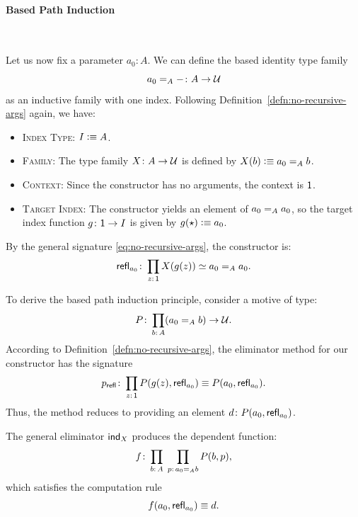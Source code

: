 \paragraph{Based Path Induction}\ 

Let us now fix a parameter $a_0\colon A$. We can define the based identity type family
\[
    a_0\eq A\dummy\colon A\to\univ
\]
as an inductive family with one index. Following Definition~\ref{defn:no-recursive-args} again, we have:
\begin{itemize}
    \item \textsc{Index Type:} $I\mathrel{\vcentcolon}\equiv A$.
    
    \item \textsc{Family:} The type family $X\colon A\to\univ$ is defined by $X(b)\mathrel{\vcentcolon}\equiv a_0\mathrel{=_{A}}b$.
    
    \item \textsc{Context:} Since the constructor has no arguments, the context is $\mathsf{1}$.
    
    \item \textsc{Target Index:} The constructor yields an element of $a_0\mathrel{=_{A}}a_0$, so the target index function $g\colon\fun1\to I$ is given by $g({\mathsf{\star}})\mathrel{\vcentcolon}\equiv a_0$.
\end{itemize}

By the general signature \eqref{eq:no-recursive-args}, the constructor is:
\[
    \fun{refl}_{a_0}\colon\prod_{z\colon\fun1}X(g(z))
        \simeq a_0\eq A a_0.
\]

To derive the based path induction principle, consider a motive of type:
\[
    P\colon\prod_{b\colon A}(a_0\eq Ab)\to\univ.
\]
According to Definition~\ref{defn:no-recursive-args}, the eliminator method for our constructor has the signature
\[
    p_{\fun{refl}}\colon\prod_{z\colon\fun1}
        P(g(z),\fun{refl}_{a_0})
        \equiv P(a_0,\fun{refl}_{a_0}).
\]
Thus, the method reduces to providing an element $d\colon P(a_0,\fun{refl}_{a_0})$.

The general eliminator $\mathsf{ind}_X$ produces the dependent function:
\[
    f\colon
        \prod_{b\colon A}\;
        \prod_{p\colon a_0\eq Ab}
        P(b,p),
\]
which satisfies the computation rule
\[
    f(a_0,\mathsf{refl}_{a_0})\equiv d.
\]

